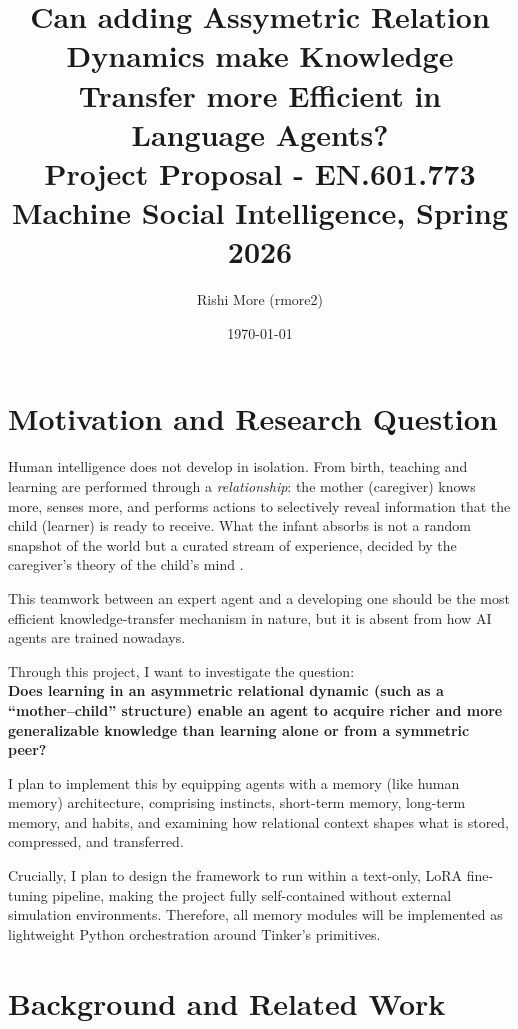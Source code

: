 \documentclass[11pt]{article}
\title{
    \vspace{-1.5cm}
    \textbf{Can adding Assymetric Relation Dynamics make Knowledge Transfer more Efficient in Language Agents?} \\[0.4em]
    \large Project Proposal - EN.601.773 Machine Social Intelligence, Spring 2026
}
\author{Rishi More (rmore2)}
\date{\today}
\begin{document}
\maketitle
\vspace{-0.5cm}
\vspace{0.4cm}


\section{Motivation and Research Question}

Human intelligence does not develop in isolation. From birth, teaching and learning are performed through a \emph{relationship}: the mother (caregiver) knows more, senses more, and performs actions to selectively reveal information that the child (learner) is ready to receive. What the infant absorbs is not a random snapshot of the world but a curated stream of experience, decided by the caregiver's theory of the child's mind \citep{gweon2021inferential,csibra2009natural}. 

This teamwork between an expert agent and a developing one should be the most efficient knowledge-transfer mechanism in nature, but it is absent from how AI agents are trained nowadays.

Through this project, I want to investigate the question:\\
\textbf{Does learning in an asymmetric relational dynamic (such as a ``mother--child'' structure) enable an agent to acquire richer and more generalizable knowledge than learning alone or from a symmetric peer?}

I plan to implement this by equipping agents with a memory (like human memory) architecture, comprising instincts, short-term memory, long-term memory, and habits, and examining how relational context shapes what is stored, compressed, and transferred.

Crucially, I plan to design the framework to run within a text-only, LoRA fine-tuning pipeline, making the project fully self-contained without external simulation environments. Therefore, all memory modules will be implemented as lightweight Python orchestration around Tinker's primitives.

\section{Background and Related Work}
\end{document}
